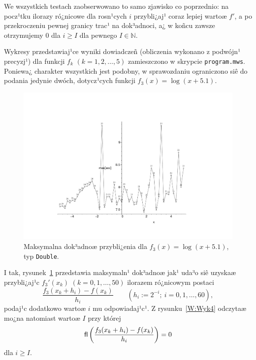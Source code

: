 \documentclass[11pt,leqno]{article}
\begin{document}
We wszystkich testach zaobserwowano to samo zjawisko co poprzednio: na pocz¹tku
ilorazy ró¿nicowe dla rosn¹cych $i$ przybli¿aj¹ coraz lepiej wartoæ $f'$, a po
przekroczeniu pewnej granicy trac¹ na dok³adnoci, a¿ w koñcu zawsze otrzymujemy
$0$ dla $i\geq I$ dla pewnego $I\in\mathbb N$.

Wykresy przedstawiaj¹ce wyniki dowiadczeñ (obliczenia wykonano z podwójn¹
precyzj¹) dla funkcji $f_k$ $(k=1,2,\ldots,5)$ zamieszczono w skrypcie
\texttt{program.mws}. Poniewa¿ charakter wszystkich jest podobny, w sprawozdaniu
ograniczono siê do podania jedynie dwóch, dotycz¹cych funkcji
$f_3(x)=\log(x+5.1)$. 

\begin{center}
\begin{figure}[!h]
\vspace{-3cm}
\hspace{-3cm}
\includegraphics[scale=0.75,angle=0]{wyk3.pdf}
\vspace{-2.25cm}
\caption{Maksymalna dok³adnoæ przybli¿enia dla $f_3(x)=\log(x+5.1)$, typ
                                              \texttt{Double}.}\label{W:Wyk3}
\end{figure}
\end{center}

I tak, rysunek~\ref{W:Wyk3} przedstawia maksymaln¹ dok³adnoæ jak¹ uda³o siê
uzyskaæ przybli¿aj¹c $f_3'(x_k)$ $(k=0,1,\ldots,50)$ ilorazem ró¿nicowym
postaci 
$$
\frac{f_3(x_k+h_i)-f(x_k)}{h_i}\qquad (h_i:=2^{-i};\ i=0,1,\ldots,60),
$$
podaj¹c dodatkowo wartoæ $i$ mu odpowiadaj¹c¹. Z rysunku~\ref{W:Wyk4} odczytaæ
mo¿na natomiast wartoæ $I$ przy której
$$
\mbox{\textsf{fl}}\left(\frac{f_3(x_k+h_i)-f(x_k)}{h_i}\right)=0
$$
dla $i\geq I$.
\end{document}
